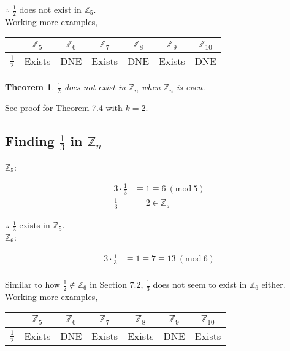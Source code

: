 \documentclass[12pt]{article}
\newcommand{\bZ}{{\mathbb{Z}}}
\newcommand{\Mod}[1]{\ (\mathrm{mod}\ #1)}
\newtheorem{theorem}{Theorem}[section]
\begin{document}
		$\therefore$ $\frac{1}{2}$ does not exist in $\bZ_5$.\\

		Working more examples,

		\begin{table}[h!]
			\centering
			\begin{tabular}{c|c|c|c|c|c|c}
				& $\bZ_5$ & $\bZ_6$ & $\bZ_7$ & $\bZ_{8}$ & $\bZ_{9}$ & $\bZ_{10}$ \\
				\hline
				\hline
				$\frac{1}{2}$ & Exists & DNE & Exists & DNE & Exists & DNE
			\end{tabular}
		\end{table}

		\begin{theorem}
			$\frac{1}{2}$ does not exist in $\bZ_n$ when $\bZ_n$ is even.
		\end{theorem}

		See proof for Theorem 7.4 with $k = 2$.

	\pagebreak

	\subsection{Finding $\frac{1}{3}$ in $\bZ_n$}

		$\bZ_5$:

		\begin{align*}
			3 \cdot \frac{1}{3} &\equiv 1 \equiv 6 \Mod{5}\\
			\frac{1}{3} &= 2 \in \bZ_5
		\end{align*}

		$\therefore$ $\frac{1}{3}$ exists in $\bZ_5$.\\

		$\bZ_6$:

		\begin{align*}
			3 \cdot \frac{1}{3} &\equiv 1 \equiv 7 \equiv 13 \Mod{6}\\
		\end{align*}

		Similar to how $\frac{1}{2} \notin \bZ_6$ in Section 7.2, $\frac{1}{3}$ does not seem to exist in $\bZ_6$ either.\\

		Working more examples,

		\begin{table}[h!]
			\centering
			\begin{tabular}{c|c|c|c|c|c|c}
				& $\bZ_5$ & $\bZ_6$ & $\bZ_7$ & $\bZ_{8}$ & $\bZ_{9}$ & $\bZ_{10}$ \\
				\hline
				\hline
				$\frac{1}{2}$ & Exists & DNE & Exists & Exists & DNE & Exists
			\end{tabular}
		\end{table}
\end{document}
